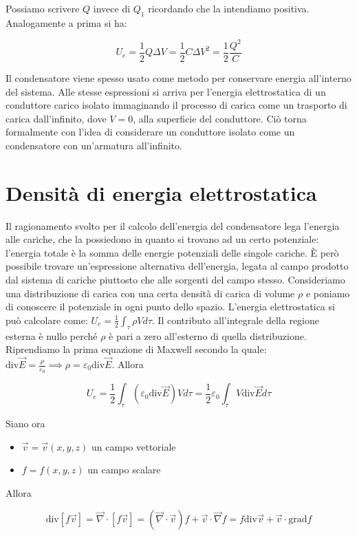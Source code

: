 Possiamo scrivere $Q$ invece di $ Q_1  $ ricordando che la intendiamo positiva. Analogamente a prima si ha:

\[
	\boxed{U_e = \frac{1}{2} Q\Delta V = \frac{1}{2} C \Delta V^2 = \frac{1}{2} \frac{Q^2}{C}}
\]

Il condensatore viene spesso usato come metodo per conservare energia all'interno del sistema.
Alle stesse espressioni si arriva per l'energia elettrostatica di un conduttore carico isolato immaginando il processo di carica come un trasporto di carica dall'infinito, dove $V=0$, alla superficie del conduttore. Ciò torna formalmente con l'idea di considerare un conduttore isolato come un condensatore con un'armatura all'infinito.

\section{Densità di energia elettrostatica}

Il ragionamento svolto per il calcolo dell'energia del condensatore lega l'energia alle cariche, che la possiedono in quanto si trovano ad un certo potenziale: l'energia totale è la somma delle energie potenziali delle singole cariche. È però possibile trovare un'espressione alternativa dell'energia, legata al campo prodotto dal sistema di cariche piuttosto che alle sorgenti del campo stesso.
Consideriamo una distribuzione di carica con una certa densità di carica di volume $\rho$ e poniamo di conoscere il potenziale in ogni punto dello spazio. L'energia elettrostatica si può calcolare come: $ U_e = \frac{1}{2} \int_{\tau}\rho Vd\tau$.
Il contributo all'integrale della regione esterna è nullo perché $ \rho  $ è pari a zero all'esterno di quella distribuzione. Riprendiamo la prima equazione di Maxwell secondo la quale: $\text{div}\vec{E} =\frac{\rho}{\varepsilon_0} \implies \rho = \varepsilon_0 \text{div}\vec{E} $.
Allora

\[
	U_e=\frac{1}{2} \int_{\tau}(\varepsilon_0 \text{div}\vec{E} ) Vd\tau = \frac{1}{2} \varepsilon_0\int_{\tau}V \text{div}\vec{E} d\tau
\]

Siano ora

\begin{itemize}
	\item $ \vec{v} =\vec{v} (x,y,z)  $ un campo vettoriale
	\item $ f=f(x,y,z)  $ un campo scalare
\end{itemize}

Allora

\[
	\text{div}[f\vec{v}] = \vec{\nabla} \cdot [f\vec{v}] = (\vec{\nabla} \cdot \vec{v} )f + \vec{v} \cdot \vec{\nabla} f = f\text{div}\vec{v} +\vec{v} \cdot \text{grad}f
\]

